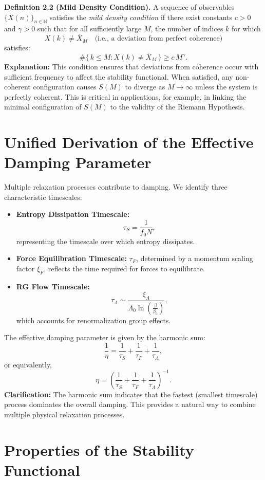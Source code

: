 \documentclass[11pt]{article}
\begin{document}
\textbf{Definition 2.2 (Mild Density Condition).} A sequence of observables $\{X(n)\}_{n \in \mathbb{N}}$ satisfies the \emph{mild density condition} if there exist constants $c > 0$ and $\gamma > 0$ such that for all sufficiently large $M$, the number of indices $k$ for which
\[
X(k) \neq \overline{X}_M \quad \text{(i.e., a deviation from perfect coherence)}
\]
satisfies:
\[
\#\{\, k \le M : X(k) \neq \overline{X}_M \,\} \ge c\,M^{\gamma}.
\]
\textbf{Explanation:} This condition ensures that deviations from coherence occur with sufficient frequency to affect the stability functional. When satisfied, any non-coherent configuration causes $S(M)$ to diverge as $M \to \infty$ unless the system is perfectly coherent. This is critical in applications, for example, in linking the minimal configuration of $S(M)$ to the validity of the Riemann Hypothesis.

\section{Unified Derivation of the Effective Damping Parameter}

Multiple relaxation processes contribute to damping. We identify three characteristic timescales:
\begin{itemize}
    \item \textbf{Entropy Dissipation Timescale:}
    \[
    \tau_S=\frac{1}{f_0 N},
    \]
    representing the timescale over which entropy dissipates.
    \item \textbf{Force Equilibration Timescale:} $\tau_F$, determined by a momentum scaling factor $\xi_F$, reflects the time required for forces to equilibrate.
    \item \textbf{RG Flow Timescale:}
    \[
    \tau_\Lambda \sim \frac{\xi_\Lambda}{\Lambda_0 \ln\left(\frac{\beta}{\beta_0}\right)},
    \]
    which accounts for renormalization group effects.
\end{itemize}
The effective damping parameter is given by the harmonic sum:
\[
\frac{1}{\eta}=\frac{1}{\tau_S}+\frac{1}{\tau_F}+\frac{1}{\tau_\Lambda},
\]
or equivalently,
\[
\eta=\left(\frac{1}{\tau_S}+\frac{1}{\tau_F}+\frac{1}{\tau_\Lambda}\right)^{-1}.
\]
\textbf{Clarification:} The harmonic sum indicates that the fastest (smallest timescale) process dominates the overall damping. This provides a natural way to combine multiple physical relaxation processes.

\section{Properties of the Stability Functional}
\end{document}
